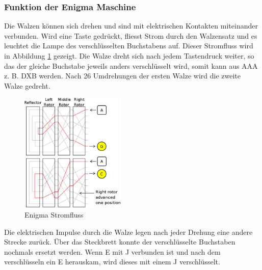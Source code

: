 \subsubsection{Funktion der Enigma Maschine}
Die Walzen können sich drehen und sind mit elektrischen Kontakten miteinander verbunden. Wird eine Taste gedrückt, fliesst Strom durch den Walzensatz und es leuchtet die Lampe des verschlüsselten Buchstabens auf. Dieser Stromfluss wird in Abbildung \ref{fig:stromfluss} gezeigt. Die Walze dreht sich nach jedem Tastendruck weiter, so das der gleiche Buchstabe jeweils anders verschlüsselt wird, somit kann aus AAA z. B. DXB werden. Nach 26 Umdrehungen der ersten Walze wird die zweite Walze gedreht. \\
%
\begin{figure}[ht]
\begin{center}
\includegraphics[width=5cm]{images/Enigma-action.png}
\caption[Enigma Stromfluss Quelle:\newline ~~~~http://upload.wikimedia.org/wikipedia/commons/6/6c/Enigma\-action.svg]{Enigma Stromfluss}
\label{fig:stromfluss}
\end{center}
\end{figure}
%
Die elektrischen Impulse durch die Walze legen nach jeder Drehung eine andere Strecke zurück. 
Über das Steckbrett konnte der verschlüsselte Buchstaben nochmals ersetzt werden. Wenn E mit J verbunden ist und nach dem verschlüsseln ein E herauskam, wird dieses mit einem J verschlüsselt. 
%
